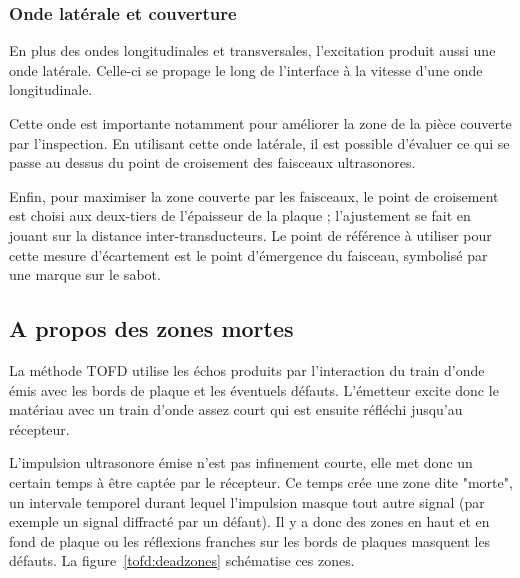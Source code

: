 \subsubsection{Onde latérale et couverture}
\label{tofd:par:laterale}

En plus des ondes longitudinales et transversales, l'excitation produit aussi une onde latérale. Celle-ci se propage le long de l'interface à la vitesse d'une onde longitudinale.

Cette onde est importante notamment pour améliorer la zone de la pièce couverte par l'inspection. En utilisant cette onde latérale, il est possible d'évaluer ce qui se passe au dessus du point de croisement des faisceaux ultrasonores.

Enfin, pour maximiser la zone couverte par les faisceaux, le point de croisement est
choisi aux deux-tiers de l'épaisseur de la plaque ; l'ajustement se fait en jouant sur la distance inter-transducteurs. Le point de référence à utiliser pour cette mesure d'écartement est le point d'émergence du faisceau, symbolisé par une marque sur le sabot.

\subsection{A propos des zones mortes}

La méthode TOFD utilise les échos produits par l'interaction du train d'onde émis avec les bords de plaque et les éventuels défauts. L'émetteur excite donc le matériau avec un train d'onde assez court qui est ensuite réfléchi jusqu'au récepteur.

L'impulsion ultrasonore émise n'est pas infinement courte, elle met donc un certain temps
à être captée par le récepteur. Ce temps crée une zone dite "morte", un intervale temporel durant lequel l'impulsion masque tout autre signal (par exemple un signal diffracté par un défaut). Il y a donc des zones en haut et en fond de plaque ou les réflexions franches sur les bords de plaques masquent les défauts. La figure~\ref{tofd:deadzones} schématise ces zones.


